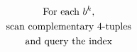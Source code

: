 \documentclass[preview]{standalone}
\begin{document}
\begin{gather*}
\special{dvisvgm:raw <g id='unique000'>}\text{For each } b^k, \\ \text{scan complementary 4-tuples}  \\ \text{and query the index}\special{dvisvgm:raw </g>}
\end{gather*}
\end{document}
